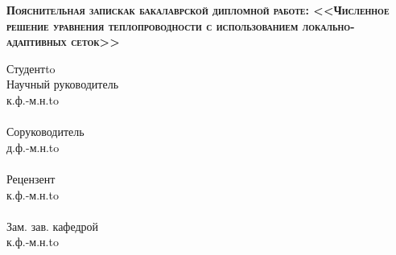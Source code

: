 \begin{titlepage}
    \newpage
    
    \vspace{3em} %
    
   
    \begin{center}
        \textsc{ \textbf{Пояснительная записка\linebreak к бакалаврской дипломной работе: \linebreak  \Large <<Численное решение уравнения теплопроводности с использованием локально-адаптивных сеток>>}}
    \end{center} 

    
    \vspace{5em}
    
   
    \newbox{\lbox}
    
    \setlength{\maxl}{\wd\lbox}
    \hfill\parbox{12cm}{
    \hspace*{1cm}\hspace*{-1cm}Студент\hfill\hbox to\\
    
    \hspace*{1cm}\hspace*{-1cm}Научный руководитель\hfill\\
    \hspace*{1cm}\hspace*{-1cm}к.ф.-м.н.\hfill\hbox to\\ \\
    \hspace*{1cm}\hspace*{-1cm}Соруководитель\hfill\\
    \hspace*{1cm}\hspace*{-1cm}д.ф.-м.н.\hfill\hbox to\\ \\
    \hspace*{1cm}\hspace*{-1cm}Рецензент\hfill\\
    \hspace*{1cm}\hspace*{-1cm}к.ф.-м.н.\hfill\hbox to\\ \\ 
    \hspace*{1cm}\hspace*{-1cm}Зам. зав. кафедрой \hfill\\
    \hspace*{1cm}\hspace*{-1cm}к.ф.-м.н.\hfill\hbox to\\ \\ 
    
    }
    
   
    
    


\end{titlepage}
